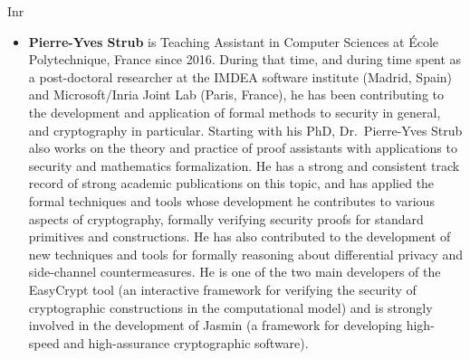 \begin{sitedescription}{Inr}
\begin{itemize}
\item {\bf Pierre-Yves Strub}
is Teaching Assistant in Computer Sciences at École
Polytechnique, France since 2016. During that time, and during time
spent as a post-doctoral researcher at the IMDEA software institute
(Madrid, Spain) and Microsoft/Inria Joint Lab (Paris, France), he has
been contributing to the development and application of formal methods
to security in general, and cryptography in particular. Starting with
his PhD, Dr.~Pierre-Yves Strub also works on the theory and practice
of proof assistants with applications to security and mathematics
formalization.
%
He has a strong and consistent track record of strong academic
publications on this topic, and has applied the formal techniques and
tools whose development he contributes to various aspects of
cryptography, formally verifying security proofs for standard
primitives and constructions.  He has also contributed to the
development of new techniques and tools for formally reasoning about
differential privacy and side-channel countermeasures.
%
He is one of the two main developers of the EasyCrypt tool (an
interactive framework for verifying the security of cryptographic
constructions in the computational model) and is strongly involved in
the development of Jasmin (a framework for developing high-speed and
high-assurance cryptographic software).

\end{itemize}

\end{sitedescription}

